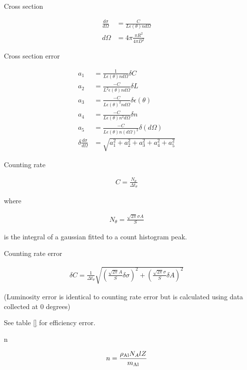 Cross section

\begin{align}
	\frac{d\sigma}{d\Omega}&=\frac{C}{L \epsilon(\theta) n d\Omega}\\
	d\Omega &= 4\pi \frac{\pi R^2}{4\pi D^2}
\end{align}

Cross section error

\begin{align}
   a_1 &= \frac{1}{L \epsilon(\theta) n d\Omega} \delta C                    \\
   a_2 &= \frac{-C}{L^2 \epsilon(\theta) n d \Omega} \delta L                \\
   a_3 &= \frac{-C}{L \epsilon(\theta)^2 n d\Omega} \delta \epsilon(\theta)  \\
   a_4 &= \frac{-C}{L \epsilon(\theta) n^2 d\Omega} \delta n                 \\
   a_5 &= \frac{-C}{L \epsilon(\theta) n (d\Omega)^2} \delta (d\Omega)       \\
\delta \frac{d\sigma}{d\Omega}&=\sqrt{a_1^2 + a_2^2 + a_3^2 + a_4^2 + a_5^2 }
\end{align}

Counting rate

\begin{align}
	C=\frac{N_\theta}{\Delta t_\theta}
\end{align}

where

\begin{align}
	N_\theta=\frac{\sqrt{2 \pi} \sigma A}{S}
\end{align}

is the integral of a gaussian fitted to a count histogram peak.

Counting rate error

\begin{align}
\delta C = \frac{1}{\Delta t_\theta} \sqrt{
   \left(\frac{\sqrt{2 \pi} A}{S} \delta \sigma\right)^2+
	\left(\frac{\sqrt{2 \pi} \sigma}{S} \delta A\right)^2
}
\end{align}

(Luminosity error is identical to counting rate error but is calculated using data collected at 0 degrees)

See table \ref{} for efficiency error.

n

\begin{align}
	n=\frac{\rho_{\rm Al} N_A l Z}{m_{\rm Al}}
\end{align}

